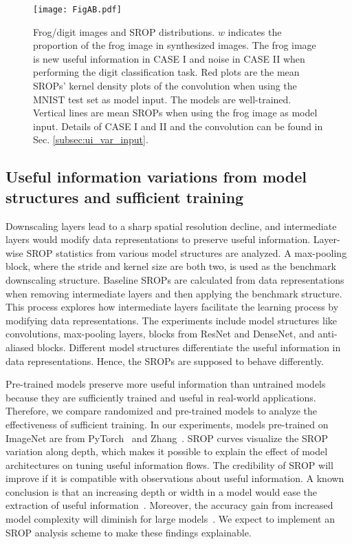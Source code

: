 \documentclass{article}
\begin{document}
\begin{figure*}
    \begin{center}
    \texttt{[image: FigAB.pdf]}
    \end{center}
    \caption{Frog/digit images and SROP distributions. $w$ indicates the proportion of the frog image in synthesized images. The frog image is new useful information in CASE I and noise in CASE II when performing the digit classification task. Red plots are the mean SROPs' kernel density plots of the convolution when using the MNIST test set as model input. The models are well-trained. Vertical lines are mean SROPs when using the frog image as model input. Details of CASE I and II and the convolution can be found in Sec. \ref{subsec:ui_var_input}.}
    \label{fig:frog}
\end{figure*}

\subsection{Useful information variations from model structures and sufficient training}\label{secsec:max_baseline}
Downscaling layers lead to a sharp spatial resolution decline, and intermediate layers would modify data representations to preserve useful information. Layer-wise SROP statistics from various model structures are analyzed. A max-pooling block, where the stride and kernel size are both two, is used as the benchmark downscaling structure. Baseline SROPs are calculated from data representations when removing intermediate layers and then applying the benchmark structure. This process explores how intermediate layers facilitate the learning process by modifying data representations. The experiments include model structures like convolutions, max-pooling layers, blocks from ResNet and DenseNet, and anti-aliased blocks. Different model structures differentiate the useful information in data representations. Hence, the SROPs are supposed to behave differently.

Pre-trained models preserve more useful information than untrained models because they are sufficiently trained and useful in real-world applications. Therefore, we compare randomized and pre-trained models to analyze the effectiveness of sufficient training. In our experiments, models pre-trained on ImageNet are from PyTorch~\cite{pytorch} and Zhang~\cite{make_conv_shift_inva}. SROP curves visualize the SROP variation along depth, which makes it possible to explain the effect of model architectures on tuning useful information flows. The credibility of SROP will improve if it is compatible with observations about useful information. A known conclusion is that an increasing depth or width in a model would ease the extraction of useful information~\cite{on_the_spectral_bias}. Moreover, the accuracy gain from increased model complexity will diminish for large models~\cite{rt_invar_2,efficient_net}. We expect to implement an SROP analysis scheme to make these findings explainable.
\end{document}
